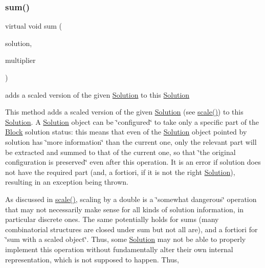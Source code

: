 \mbox{\label{class_s_m_spp__di__unipi__it_1_1_solution_adc2450947fd142657637bf79d91505a9}} 
\subsubsection{\texorpdfstring{sum()}{sum()}}
{\footnotesize\ttfamily virtual void sum (\begin{DoxyParamCaption}\item[{const \mbox{\hyperlink{class_s_m_spp__di__unipi__it_1_1_solution}{Solution}} $\ast$}]{solution,  }\item[{double}]{multiplier }\end{DoxyParamCaption})\hspace{0.3cm}{\ttfamily [pure virtual]}}



adds a scaled version of the given \mbox{\hyperlink{class_s_m_spp__di__unipi__it_1_1_solution}{Solution}} to this \mbox{\hyperlink{class_s_m_spp__di__unipi__it_1_1_solution}{Solution}} 

This method adds a scaled version of the given \mbox{\hyperlink{class_s_m_spp__di__unipi__it_1_1_solution}{Solution}} (see \mbox{\hyperlink{class_s_m_spp__di__unipi__it_1_1_solution_abf1a2d1763f128a72b2677d4b9ff4d3b}{scale()}}) to this \mbox{\hyperlink{class_s_m_spp__di__unipi__it_1_1_solution}{Solution}}. A \mbox{\hyperlink{class_s_m_spp__di__unipi__it_1_1_solution}{Solution}} object can be \char`\"{}configured\char`\"{} to take only a specific part of the \mbox{\hyperlink{class_s_m_spp__di__unipi__it_1_1_block}{Block}} solution status\+: this means that even of the \mbox{\hyperlink{class_s_m_spp__di__unipi__it_1_1_solution}{Solution}} object pointed by solution has \char`\"{}more information\char`\"{} than the current one, only the relevant part will be extracted and summed to that of the current one, so that \char`\"{}the original configuration is preserved\char`\"{} even after this operation. It is an error if solution does not have the required part (and, a fortiori, if it is not the right \mbox{\hyperlink{class_s_m_spp__di__unipi__it_1_1_solution}{Solution}}), resulting in an exception being thrown.

As discussed in \mbox{\hyperlink{class_s_m_spp__di__unipi__it_1_1_solution_abf1a2d1763f128a72b2677d4b9ff4d3b}{scale()}}, scaling by a double is a \char`\"{}somewhat dangerous\char`\"{} operation that may not necessarily make sense for all kinds of solution information, in particular discrete ones. The same potentially holds for sums (many combinatorial structures are closed under sum but not all are), and a fortiori for \char`\"{}sum with a scaled object\char`\"{}. Thus, some \mbox{\hyperlink{class_s_m_spp__di__unipi__it_1_1_solution}{Solution}} may not be able to properly implement this operation without fundamentally alter their own internal representation, which is not supposed to happen. Thus,

